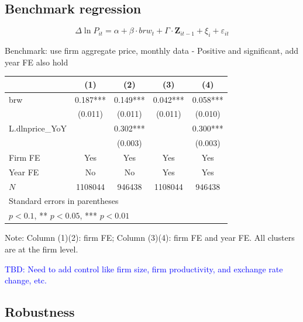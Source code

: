 \documentclass[12pt]{article}
\begin{document}
\subsection{Benchmark regression}

\begin{equation}
    \Delta \ln P_{it} = \alpha+\beta \cdot brw_{t}+ \Gamma \cdot \textbf{Z}_{it-1}+\xi_{i}+\varepsilon_{i t}
\end{equation}


Benchmark: use firm aggregate price, monthly data
- Positive and significant, add year FE also hold

\begin{center}
\begin{tabular}{l*{4}{c}}
\toprule
            &\multicolumn{1}{c}{(1)}   &\multicolumn{1}{c}{(2)}   &\multicolumn{1}{c}{(3)}   &\multicolumn{1}{c}{(4)}   \\
\midrule
brw         &       0.187***&       0.149***&       0.042***&       0.058***\\
            &     (0.011)   &     (0.011)   &     (0.011)   &     (0.010)   \\
\addlinespace
L.dlnprice\_YoY&               &       0.302***&               &       0.300***\\
            &               &     (0.003)   &               &     (0.003)   \\
\addlinespace
Firm FE     &         Yes   &         Yes   &         Yes   &         Yes   \\
\addlinespace
Year FE     &          No   &          No   &         Yes   &         Yes   \\
\midrule
\(N\)       &     1108044   &      946438   &     1108044   &      946438   \\
\bottomrule
\multicolumn{5}{l}{\footnotesize Standard errors in parentheses}\\
\multicolumn{5}{l}{\footnotesize * \(p<0.1\), ** \(p<0.05\), *** \(p<0.01\)}\\
\end{tabular}
\end{center}

Note: Column (1)(2): firm FE; Column (3)(4): firm FE and year FE. All clusters are at the firm level.

\textcolor{blue}{TBD: Need to add control like firm size, firm productivity, and exchange rate change, etc.}

\subsection{Robustness}
\end{document}
